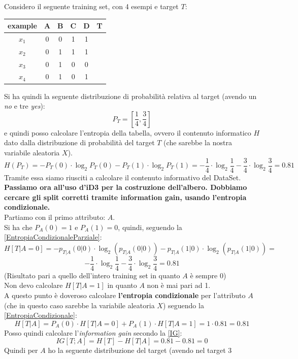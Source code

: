 \begin{esempio}
  Considero il seguente training set, con 4 esempi e target $T$:
  \begin{table}[H]
    \centering
    \begin{tabular}{c|c|c|c|c|c}
      example & A & B & C & D & T\\
      \hline
      $x_1$ & 0 & 0 & 1 & 1 & \color{darkgreen}{1}\\
      $x_2$ & 0 & 1 & 1 & 1 & \color{darkgreen}{1}\\
      $x_3$ & 0 & 1 & 0 & 0 & \color{red}{0}\\
      $x_4$ & 0 & 1 & 0 & 1 & \color{darkgreen}{1}\\
    \end{tabular}
  \end{table}
  Si ha quindi la seguente distribuzione di probabilità relativa al target
  (avendo un \textit{no} e tre \textit{yes}):
  \[P_T=\left[\frac{1}{4},\frac{3}{4}\right]\]
  e quindi posso calcolare l'entropia della tabella, ovvero il contenuto informatico $H$ dato dalla distribuzione di probabilità del target $T$ (che sarebbe la nostra variabile aleatoria $X$).
  \[H(P_T)=-P_T(0)\cdot \log_2 P_T(0)-P_T(1)\cdot\log_2
    P_T(1)=-\frac{1}{4}\cdot\log_2\frac{1}{4}-\frac{3}{4}\cdot\log_2
    \frac{3}{4}= 0.81\]
    Tramite essa siamo riusciti a calcolare il contenuto informativo del DataSet.
\textbf{  Passiamo ora all'uso d'iD3 per la costruzione dell'albero. Dobbiamo cercare gli split corretti tramite information gain, usando
  l'entropia condizionale.\\}
  Partiamo con il primo attributo: $A$.\\ Si ha che $P_A(0)=1$ e $P_A(1)=0$,
  quindi, seguendo la \ref{EntropiaCondizionaleParziale}:
  \[H[T|A=0]=-p_{T|A}(0|0)\cdot \log_2(p_{T|A}(0|0))-p_{T|A}(1|0)\cdot
    \log_2(p_{T|A}(1|0))=\]
  \[-\frac{1}{4}\cdot\log_2\frac{1}{4}-
    \frac{3}{4}\cdot\log_2\frac{3}{4}=0.81\]
  (Risultato pari a quello dell'intero training set in quanto $A$ è sempre 0)\\
  Non devo calcolare $H[T|A=1]$ in quanto $A$ non è mai pari ad 1.\\
  A questo punto è doveroso calcolare \textbf{l'entropia condizionale} per l'attributo $A$ (che in questo caso sarebbe la variabile aleatoria $X$) seguendo la \ref{EntropiaCondizionale}:
  \[H[T|A]=P_A(0)\cdot H[T|A=0]+P_A(1)\cdot H[T|A=1]=1\cdot 0.81=0.81\]
  Posso quindi calcolare l'\textit{information gain} secondo la \ref{IG}:
  \[IG[T;A]=H[T]-H[T|A]=0.81-0.81=0\]
  Quindi per $A$ ho la seguente distribuzione del target (avendo nel target 3

\end{esempio}
